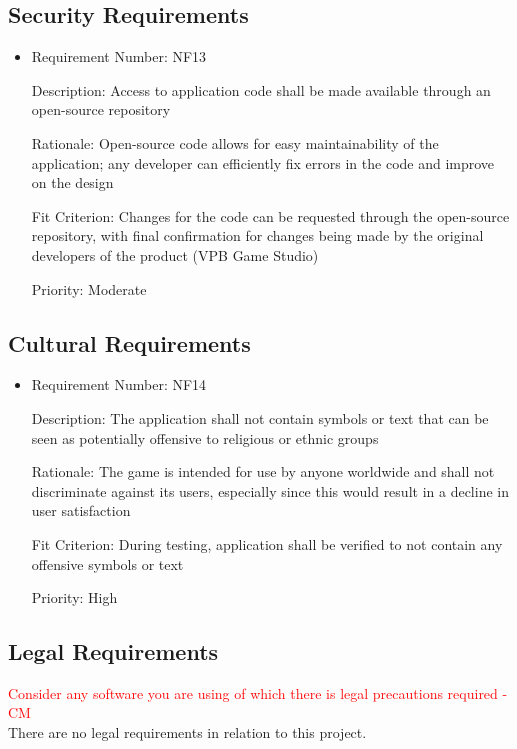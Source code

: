 \documentclass[12pt, titlepage]{article}
\begin{document}
\subsection{Security Requirements}
\begin{itemize}
	\item
	Requirement Number: NF13

	Description: Access to application code shall be made available through an open-source repository

	Rationale: Open-source code allows for easy maintainability of the application; any developer can efficiently fix errors in the code and improve on the design

	Fit Criterion: Changes for the code can be requested through the open-source repository, with final confirmation for changes being made by the original developers of the product (VPB Game Studio)

	Priority: Moderate
\end{itemize}

\subsection{Cultural Requirements}
\begin{itemize}
	\item
	Requirement Number: NF14

	Description: The application shall not contain symbols or text that can be seen as potentially offensive to religious or ethnic groups

	Rationale: The game is intended for use by anyone worldwide and shall not discriminate against its users, especially since this would result in a decline in user satisfaction

	Fit Criterion: During testing, application shall be verified to not contain any offensive symbols or text

	Priority: High
\end{itemize}

\subsection{Legal Requirements}
\textcolor{red}{Consider any software you are using of which there is legal precautions required - CM} \\
There are no legal requirements in relation to this project.
\end{document}
